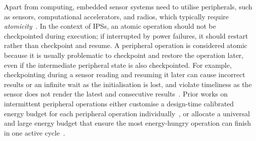 




Apart from computing, embedded sensor systems need to utilise peripherals, such as sensors, computational accelerators, and radios, which typically require \textit{atomicity}~\cite{berthou2020formal}.
In the context of IPSs, an atomic operation should not be checkpointed during execution; if interrupted by power failures, it should restart rather than checkpoint and resume.
A peripheral operation is considered atomic because it is usually problematic to checkpoint and restore the operation later, even if the intermediate peripheral state is also checkpointed.
For example, checkpointing during a sensor reading and resuming it later can cause incorrect results or an infinite wait as the initialisation is lost, and violate timeliness as the sensor does not render the latest and consecutive results~\cite{maeng2019supporting}. 
Prior works on intermittent peripheral operations either customise a design-time calibrated energy budget for each peripheral operation individually~\cite{gomez2016dynamic}, or allocate a universal and large energy budget that ensure the most energy-hungry operation can finish in one active cycle~\cite{maeng2019supporting}.


